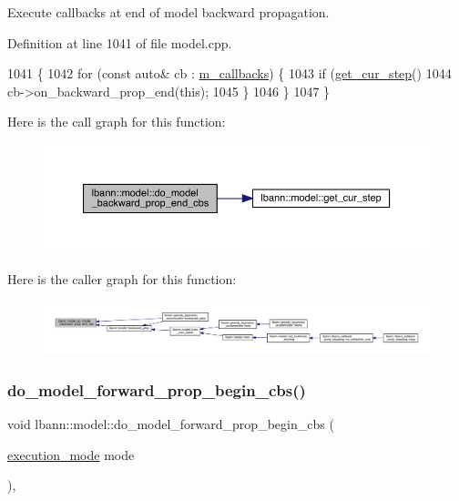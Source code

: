 Execute callbacks at end of model backward propagation. 

Definition at line 1041 of file model.\+cpp.


\begin{DoxyCode}
1041                                            \{
1042   \textcolor{keywordflow}{for} (\textcolor{keyword}{const} \textcolor{keyword}{auto}& cb : \hyperlink{classlbann_1_1model_a07b511fef30368494c2ad80922ffd0eb}{m\_callbacks}) \{
1043     \textcolor{keywordflow}{if} (\hyperlink{classlbann_1_1model_ad0cdcba177434b52dc9c4a97be183a92}{get\_cur\_step}() %
1044       cb->on\_backward\_prop\_end(\textcolor{keyword}{this});
1045     \}
1046   \}
1047 \}
\end{DoxyCode}
Here is the call graph for this function\+:\nopagebreak
\begin{figure}[H]
\begin{center}
\leavevmode
\includegraphics[width=350pt]{classlbann_1_1model_a737a0129eadf52be476034888b3eedc2_cgraph}
\end{center}
\end{figure}
Here is the caller graph for this function\+:\nopagebreak
\begin{figure}[H]
\begin{center}
\leavevmode
\includegraphics[width=350pt]{classlbann_1_1model_a737a0129eadf52be476034888b3eedc2_icgraph}
\end{center}
\end{figure}
\mbox{\label{classlbann_1_1model_af3c45642bbacf1bd07e8504d7e689ec0}} 
\subsubsection{\texorpdfstring{do\+\_\+model\+\_\+forward\+\_\+prop\+\_\+begin\+\_\+cbs()}{do\_model\_forward\_prop\_begin\_cbs()}}
{\footnotesize\ttfamily void lbann\+::model\+::do\+\_\+model\+\_\+forward\+\_\+prop\+\_\+begin\+\_\+cbs (\begin{DoxyParamCaption}\item[{\hyperlink{base_8hpp_a2781a159088df64ed7d47cc91c4dc0a8}{execution\+\_\+mode}}]{mode }\end{DoxyParamCaption})\hspace{0.3cm}{\ttfamily [protected]}, {\ttfamily [virtual]}}

